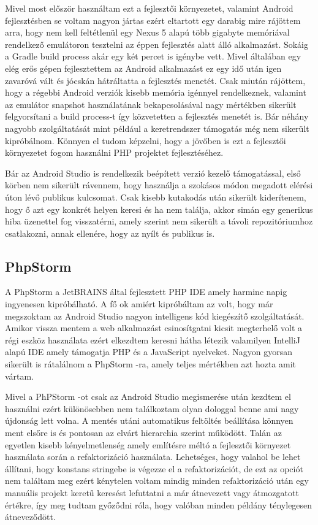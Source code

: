 \documentclass[12pt]{report}
\theoremstyle{definition}
\begin{document}
	Mivel most először használtam ezt a fejlesztői környezetet, valamint Android fejlesztésben se voltam nagyon jártas ezért eltartott egy darabig mire rájöttem arra, hogy nem kell feltétlenül egy Nexus 5 alapú több gigabyte memóriával rendelkező emulátoron tesztelni az éppen fejlesztés alatt álló alkalmazást. Sokáig a Gradle build process akár egy két percet is igénybe vett. Mivel általában egy elég erős gépen fejlesztettem az Android alkalmazást ez egy idő után igen zavaróvá vált és jócskán hátráltatta a fejlesztés menetét. Csak miután rájöttem, hogy a régebbi Android verziók kisebb memória igénnyel rendelkeznek, valamint az emulátor snapshot használatának bekapcsolásával nagy mértékben sikerült felgyorsítani a build process-t így közvetetten a fejlesztés menetét is. Bár néhány nagyobb szolgáltatását mint például a keretrendszer támogatás még nem sikerült kipróbálnom. Könnyen el tudom képzelni, hogy a jövőben is ezt a fejlesztői környezetet fogom használni PHP projektet fejlesztéséhez.
	
	Bár az Android Studio is rendelkezik beépített verzió kezelő támogatással, első körben nem sikerült rávennem, hogy használja a szokásos módon megadott elérési úton lévő publikus kulcsomat. Csak kisebb kutakodás után sikerült kiderítenem, hogy ő azt egy konkrét helyen keresi és ha nem találja, akkor simán egy generikus hiba üzenettel fog visszatérni, amely szerint nem sikerült a távoli repozitóriumhoz csatlakozni, annak ellenére, hogy az nyílt és publikus is.
	
	\subsection{PhpStorm}
	A PhpStorm a JetBRAINS által fejlesztett PHP IDE amely harminc napig ingyenesen kipróbálható. A fő ok amiért kipróbáltam az volt, hogy már megszoktam az Android Studio nagyon intelligens kód kiegészítő szolgáltatását. Amikor vissza mentem a web alkalmazást csinosítgatni kicsit megterhelő volt a régi eszköz használata ezért elkezdtem keresni hátha létezik valamilyen IntelliJ alapú IDE amely támogatja PHP és a JavaScript nyelveket. Nagyon gyorsan sikerült is rátalálnom a PhpStorm -ra, amely teljes mértékben azt hozta amit vártam.
	
	Mivel a PhPStorm -ot csak az Android Studio megismerése után kezdtem el használni ezért különösebben nem találkoztam olyan dologgal benne ami nagy újdonság lett volna. A mentés utáni automatikus feltöltés beállítása könnyen ment elsőre is és pontosan az elvárt hierarchia szerint működött. Talán az egyetlen kisebb kényelmetlenség amely említésre méltó a fejlesztői környezet használata során a refaktorizáció használata. Lehetséges, hogy valahol be lehet állítani, hogy konstans stringebe is végezze el a refaktorizációt, de ezt az opciót nem találtam meg ezért kénytelen voltam mindig minden refaktorizáció után egy manuális projekt keretű keresést lefuttatni a már átnevezett vagy átmozgatott értékre, így meg tudtam győződni róla, hogy valóban minden példány ténylegesen átneveződött.
	
\end{document}
